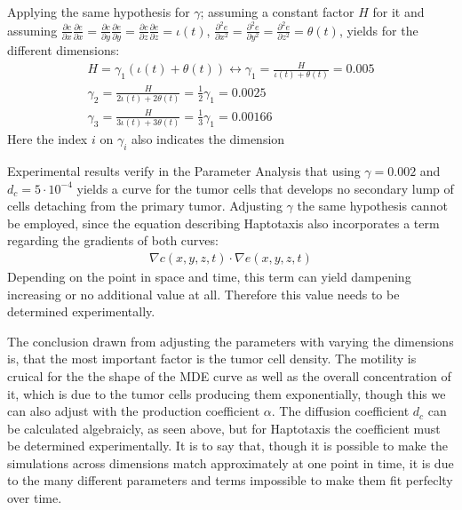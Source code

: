 Applying the same hypothesis for $\gamma$; assuming a constant factor $H$ for it and assuming $\frac{\partial c}{\partial x}\frac{\partial e}{\partial x}=\frac{\partial c}{\partial y}\frac{\partial e}{\partial y}=\frac{\partial c}{\partial z}\frac{\partial e}{\partial z}=\iota(t)$, $\frac{\partial^{2}e}{\partial x^{2}}=\frac{\partial^{2}e}{\partial y^{2}}=\frac{\partial^{2}e}{\partial z^{2}}=\theta(t)$, yields for the different dimensions:
\begin{align*}
    H=\gamma_{1}(\iota(t) +\theta(t) )\leftrightarrow \gamma_1 = \frac{H}{\iota(t) + \theta(t)} = 0.005 \\
    \gamma_2 = \frac{H}{2\iota(t) + 2\theta(t)} = \frac{1}{2} \gamma_1 = 0.0025 \\
    \gamma_3 = \frac{H}{3\iota(t) + 3\theta(t)} = \frac{1}{3} \gamma_1 = 0.00166
\end{align*}
Here the index $i$ on $\gamma_{i}$ also indicates the dimension

Experimental results verify in the Parameter Analysis that using $\gamma=0.002$ and $d_c=5\cdot 10^{-4}$ yields a curve for the tumor cells that develops no secondary lump of cells detaching from the primary tumor. Adjusting $\gamma$ the same hypothesis cannot be employed, since the equation describing Haptotaxis also incorporates a term regarding the gradients of both curves:
\begin{align*} 
    \nabla c(x,y,z,t) \cdot \nabla e(x,y,z,t)
\end{align*}
Depending on the point in space and time, this term can yield dampening increasing or no additional value at all. Therefore this value needs to be determined experimentally.

The conclusion drawn from adjusting the parameters with varying the dimensions is, that the most important factor is the tumor cell density. The motility is cruical for the the shape of the MDE curve as well as the overall concentration of it, which is due to the tumor cells producing them exponentially, though this we can also adjust with the production coefficient $\alpha$. The diffusion coefficient $d_c$ can be calculated algebraicly, as seen above, but for Haptotaxis the coefficient must be determined experimentally. It is to say that, though it is possible to make the simulations across dimensions match approximately at one point in time, it is due to the many different parameters and terms impossible to make them fit perfeclty over time.


